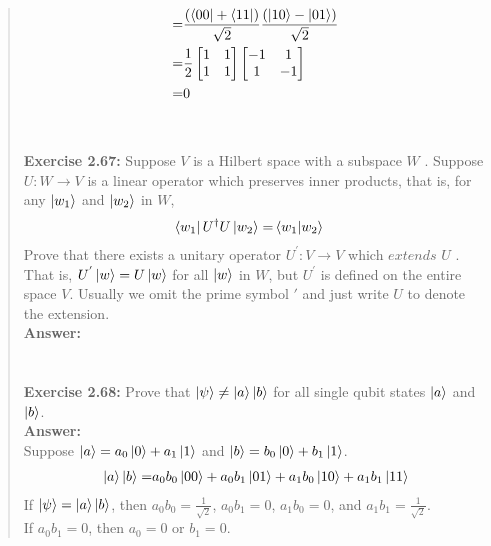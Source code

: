 \documentclass[UTF8]{ctexart}
\begin{document}
\begin{quote}
\begin{equation}
\begin{aligned}
			=&\frac{(\bra{00}+\bra{11})}{\sqrt{2}}\frac{(\ket{10}-\ket{01})}{\sqrt{2}}\\
			=&\frac{1}{2}\begin{bmatrix}
				1 & 1 \\ 1 & 1
			\end{bmatrix}
			\begin{bmatrix}
				-1 & 1 \\ 1 & -1
			\end{bmatrix} \\
			=&0
\end{aligned}
\end{equation}
\\
\\
\textbf{Exercise 2.67: } 
Suppose $V$ is a Hilbert space with a subspace $W$ . Suppose
$U:W \rightarrow V$ is a linear operator which preserves inner products, 
that is, for any $\ket{w_{1}}$ and $\ket{w_{2}}$ in $W$,
\begin{equation}
	\begin{aligned}
 \bra{w_{1}}U^{\dagger}U\ket{w_{2}}=&\bra{w_{1}}\ket{w_{2}}
	\end{aligned}
\end{equation}
Prove that there exists a unitary operator $U^{'}: V \rightarrow V$ which $extends$ $U$ .
 That is, $ U^{'}\ket{w} = U\ket{w}$ for all $\ket{w}$ in $W$, but $U^{'}$ is defined on the entire space $V$.
  Usually we omit the prime symbol $′$ and just write $U$ to denote the extension.
\\
	\textbf{Answer:}\\
	\\
\\
\textbf{Exercise 2.68: } Prove that $\ket{\psi}\neq \ket{a}\ket{b}$ for all single qubit states $\ket{a}$ and $\ket{b}$.
 \\
\textbf{Answer:}\\
Suppose $\ket{a}=a_{0}\ket{0}+a_{1}\ket{1}$ and $\ket{b}=b_{0}\ket{0}+b_{1}\ket{1} $.
\begin{equation}
	\begin{aligned}
		\ket{a}\ket{b}=&a_{0}b_{0}\ket{00}+a_{0}b_{1}\ket{01}+a_{1}b_{0}\ket{10}+a_{1}b_{1}\ket{11}\\
	\end{aligned}
\end{equation}
	If $\ket{\psi}= \ket{a}\ket{b}$, then $a_{0}b_{0}=\frac{1}{\sqrt{2}}$, $a_{0}b_{1}=0$, $a_{1}b_{0}=0$, and $a_{1}b_{1}=\frac{1}{\sqrt{2}}$.\\
	If $a_{0}b_{1}=0$, then $a_{0}=0$ or $b_{1}=0$.\\

\end{quote}
\end{document}
